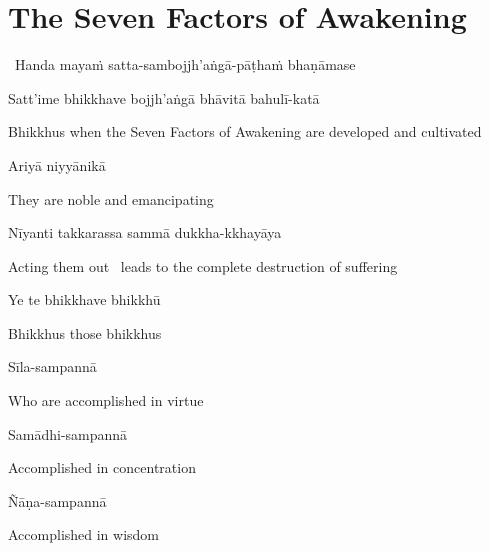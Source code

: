 \suttaRef{[DN 16]}


\section{The Seven Factors of Awakening}
\label{seven-factors-of-awakening}

\begin{leader}
  \anglebracketleft\ \hspace{-0.5mm}Handa mayaṁ satta-sambojjh'aṅgā-pāṭhaṁ bhaṇāmase \hspace{-0.5mm}\anglebracketright\
\end{leader}

Satt'ime bhikkhave bojjh'aṅgā bhāvitā bahulī-katā

\begin{english-hang}
  Bhikkhus when the Seven Factors of Awakening are developed and cultivated
\end{english-hang}

Ariyā niyyānikā

\begin{english}
  They are noble and emancipating
\end{english}

Nīyanti takkarassa sammā dukkha-kkhayāya

\begin{english}
  Acting them out \breathmark\ leads to the complete destruction of suffering
\end{english}

\suttaRef{[SN 46.19]}

Ye te bhikkhave bhikkhū

\begin{english}
  Bhikkhus those bhikkhus
\end{english}

Sīla-sampannā

\begin{english}
  Who are accomplished in virtue
\end{english}

Samādhi-sampannā

\begin{english}
  Accomplished in concentration
\end{english}

Ñāṇa-sampannā

\begin{english}
  Accomplished in wisdom
\end{english}

